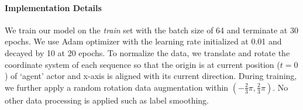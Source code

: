\paragraph{Implementation Details}
We train our model on the \emph{train} set with the batch size of 64 and terminate at 30
epochs. We use Adam \cite{adam} optimizer with the learning rate initialized at 0.01 and decayed by 10 at 20 epochs. To normalize the data, we translate and rotate the coordinate system of each sequence so that
the origin is at current position ($t=0$) of `agent' actor and x-axis is aligned
with its current direction. During training, we further apply a random rotation
data augmentation within $(-\frac{2}{3}\pi, \frac{2}{3}\pi)$. No other data
processing is applied such as label smoothing. 


